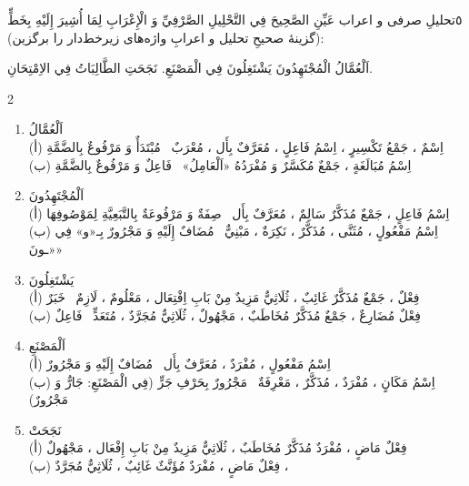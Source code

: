 \begin{JTamrin}{٥}{تحلیلِ صرفی و اعراب}
عَيِّنِ الصَّحِيحَ فِي التَّحْلِيلِ الصَّرْفِيِّ وَ الْإِعْرَابِ لِمَا أُشِيرَ
إِلَيْهِ بِخَطٍّ (گزینهٔ صحیحِ تحلیل و اعرابِ واژه‌های زیرخط‌دار را برگزین):

\begin{center}
\Ar اَلْعُمَّالُ الْمُجْتَهِدُونَ يَشْتَغِلُونَ فِي الْمَصْنَعِ.\quad
\Ar نَجَحَتِ الطَّالِبَاتُ فِي الاِمْتِحَانِ.
\end{center}

\begin{multicols}{2}
\begin{enumerate}
  \item اَلْعُمَّالُ\\
        (أ) اِسْمٌ ، جَمْعُ تَكْسِيرٍ ، اِسْمُ فَاعِلٍ ، مُعَرَّفٌ بِأَل ،
        مُعْرَبٌ \textbar\ مُبْتَدَأٌ وَ مَرْفُوعٌ بِالضَّمَّةِ\\
        (ب) اِسْمُ مُبَالَغَةٍ ، جَمْعٌ مُكَسَّرٌ وَ مُفْرَدُهُ «اَلْعَامِلُ»
        \textbar\ فَاعِلٌ وَ مَرْفُوعٌ بِالضَّمَّةِ
  \item اَلْمُجْتَهِدُونَ\\
        (أ) اِسْمُ فَاعِلٍ ، جَمْعٌ مُذَكَّرٌ سَالِمٌ ، مُعَرَّفٌ بِأَل
        \textbar\ صِفَةٌ وَ مَرْفُوعَةٌ بِالتَّبَعِيَّةِ لِمَوْصُوفِهَا\\
        (ب) اِسْمُ مَفْعُولٍ ، مُثَنَّى ، مُذَكَّرٌ ، نَكِرَةٌ ، مَبْنِيٌّ
        \textbar\ مُضَافٌ إِلَيْهِ وَ مَجْرُورٌ بِـ«و» فِي «ـونَ»
  \item يَشْتَغِلُونَ\\
        (أ) فِعْلٌ ، جَمْعٌ مُذَكَّرٌ غَائِبٌ ، ثُلَاثِيٌّ مَزِيدٌ مِنْ بَابِ
        اِفْتِعَال ، مَعْلُومٌ ، لَازِمٌ \textbar\ خَبَرٌ\\
        (ب) فِعْلٌ مُضَارِعٌ ، جَمْعٌ مُذَكَّرٌ مُخَاطَبٌ ، مَجْهُولٌ ،
        ثُلَاثِيٌّ مُجَرَّدٌ ، مُتَعَدٍّ \textbar\ فَاعِلٌ
  \item اَلْمَصْنَعِ\\
        (أ) اِسْمُ مَفْعُولٍ ، مُفْرَدٌ ، مُعَرَّفٌ بِأَل \textbar\ مُضَافٌ
        إِلَيْهِ وَ مَجْرُورٌ\\
        (ب) اِسْمُ مَكَانٍ ، مُفْرَدٌ ، مُذَكَّرٌ ، مَعْرِفَةٌ \textbar\
        مَجْرُورٌ بِحَرْفِ جَرٍّ (فِي الْمَصْنَعِ: جَارٌّ وَ مَجْرُورٌ)
  \item نَجَحَتْ\\
        (أ) فِعْلٌ مَاضٍ ، مُفْرَدٌ مُذَكَّرٌ مُخَاطَبٌ ، ثُلَاثِيٌّ مَزِيدٌ
        مِنْ بَابِ إِفْعَال ، مَجْهُولٌ\\
        (ب) فِعْلٌ مَاضٍ ، مُفْرَدٌ مُؤَنَّثٌ غَائِبٌ ، ثُلَاثِيٌّ مُجَرَّدٌ ،

\end{enumerate}
\end{multicols}
\end{JTamrin}

